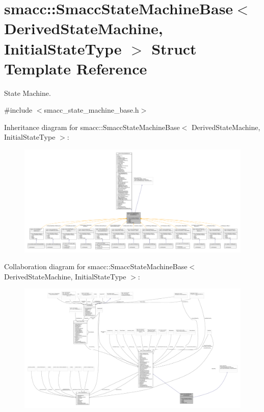 \hypertarget{structsmacc_1_1SmaccStateMachineBase}{}\section{smacc\+:\+:Smacc\+State\+Machine\+Base$<$ Derived\+State\+Machine, Initial\+State\+Type $>$ Struct Template Reference}
\label{structsmacc_1_1SmaccStateMachineBase}


State Machine.  




{\ttfamily \#include $<$smacc\+\_\+state\+\_\+machine\+\_\+base.\+h$>$}



Inheritance diagram for smacc\+:\+:Smacc\+State\+Machine\+Base$<$ Derived\+State\+Machine, Initial\+State\+Type $>$\+:
\nopagebreak
\begin{figure}[H]
\begin{center}
\leavevmode
\includegraphics[width=350pt]{structsmacc_1_1SmaccStateMachineBase__inherit__graph}
\end{center}
\end{figure}


Collaboration diagram for smacc\+:\+:Smacc\+State\+Machine\+Base$<$ Derived\+State\+Machine, Initial\+State\+Type $>$\+:
\nopagebreak
\begin{figure}[H]
\begin{center}
\leavevmode
\includegraphics[width=350pt]{structsmacc_1_1SmaccStateMachineBase__coll__graph}
\end{center}
\end{figure}
